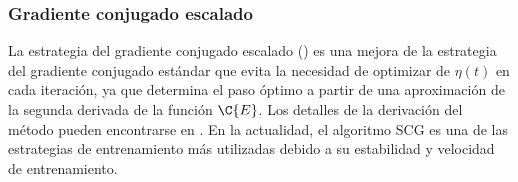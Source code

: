 %
\subsubsection{Gradiente conjugado escalado}
%
La estrategia del gradiente conjugado escalado () \cite{scg} es una mejora de la estrategia del
gradiente conjugado estándar que evita la necesidad de optimizar de
$\eta(t)$ en cada iteración, ya que determina el paso óptimo a partir
de una aproximación de la segunda derivada de la función $\C{E}$.  Los
detalles de la derivación del método pueden encontrarse en
\cite{scg}. En la actualidad, el algoritmo SCG es una de las
estrategias de entrenamiento más utilizadas debido a su estabilidad y
velocidad de entrenamiento.
